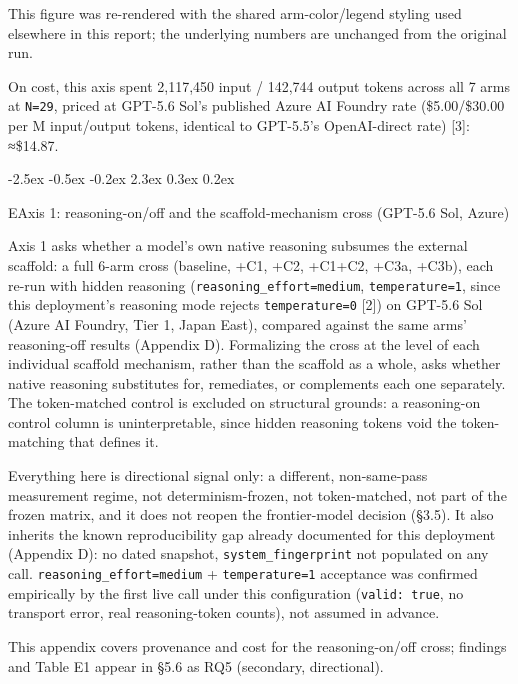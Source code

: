 \documentclass[
  11pt,
]{article}
\makeatletter
\renewcommand{\section}{%
  \@startsection{section}{1}{\z@}%
                {-2.5ex \@plus -0.5ex \@minus -0.2ex}%
                { 2.3ex \@plus  0.3ex \@minus  0.2ex}%
                {\large\bf\raggedright}%
}
\makeatother
\begin{document}
This figure was re-rendered with the shared arm-color/legend styling used elsewhere in this report; the underlying numbers are unchanged from the original run.

On cost, this axis spent 2,117,450 input / 142,744 output tokens across all 7 arms at \texttt{N=29}, priced at GPT-5.6 Sol's published Azure AI Foundry rate (\$5.00/\$30.00 per M input/output tokens, identical to GPT-5.5's OpenAI-direct rate) {[}3{]}: ≈\$14.87.

\section{E\quad Axis 1: reasoning-on/off and the scaffold-mechanism cross (GPT-5.6 Sol, Azure)}\label{e-axis-1-reasoning-onoff-and-the-scaffold-mechanism-cross-gpt-5.6-sol-azure}

Axis 1 asks whether a model's own native reasoning subsumes the external scaffold: a full 6-arm cross (baseline, +C1, +C2, +C1+C2, +C3a, +C3b), each re-run with hidden reasoning (\texttt{reasoning\_effort=\textquotesingle{}medium\textquotesingle{}}, \texttt{temperature=1}, since this deployment's reasoning mode rejects \texttt{temperature=0} {[}2{]}) on GPT-5.6 Sol (Azure AI Foundry, Tier 1, Japan East), compared against the same arms' reasoning-off results (Appendix D). Formalizing the cross at the level of each individual scaffold mechanism, rather than the scaffold as a whole, asks whether native reasoning substitutes for, remediates, or complements each one separately. The token-matched control is excluded on structural grounds: a reasoning-on control column is uninterpretable, since hidden reasoning tokens void the token-matching that defines it.

Everything here is directional signal only: a different, non-same-pass measurement regime, not determinism-frozen, not token-matched, not part of the frozen matrix, and it does not reopen the frontier-model decision (§3.5). It also inherits the known reproducibility gap already documented for this deployment (Appendix D): no dated snapshot, \texttt{system\_fingerprint} not populated on any call. \texttt{reasoning\_effort=\textquotesingle{}medium\textquotesingle{}} + \texttt{temperature=1} acceptance was confirmed empirically by the first live call under this configuration (\texttt{valid:\ true}, no transport error, real reasoning-token counts), not assumed in advance.

This appendix covers provenance and cost for the reasoning-on/off cross; findings and Table E1 appear in §5.6 as RQ5 (secondary, directional).
\end{document}
